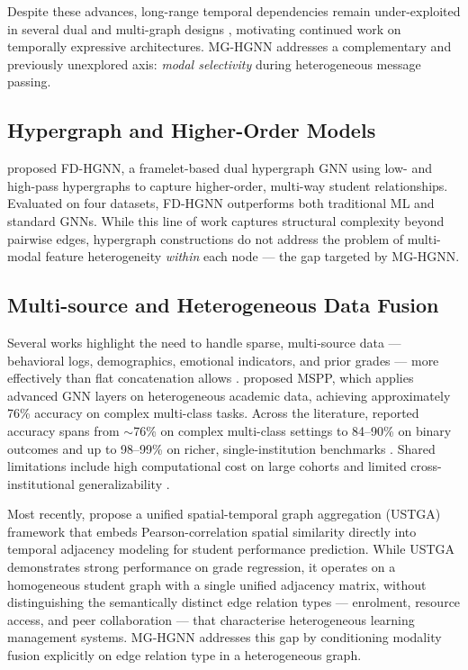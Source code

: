 \documentclass[sigconf,review]{acmart}
\begin{document}
Despite these advances, long-range temporal dependencies remain
under-exploited in several dual and multi-graph designs
\citep{huang2024dual, huang2024temporal, balachandar2024mspp}, motivating
continued work on temporally expressive architectures. MG-HGNN addresses
a complementary and previously unexplored axis: \emph{modal selectivity}
during heterogeneous message passing.

\subsection{Hypergraph and Higher-Order Models}

\citet{yang2024hypergraph} proposed FD-HGNN, a framelet-based dual
hypergraph GNN using low- and high-pass hypergraphs to capture higher-order,
multi-way student relationships. Evaluated on four datasets, FD-HGNN
outperforms both traditional ML and standard GNNs. While this line of work
captures structural complexity beyond pairwise edges, hypergraph
constructions do not address the problem of multi-modal feature
heterogeneity \emph{within} each node --- the gap targeted by MG-HGNN.

\subsection{Multi-source and Heterogeneous Data Fusion}

Several works highlight the need to handle sparse, multi-source data ---
behavioral logs, demographics, emotional indicators, and prior grades ---
more effectively than flat concatenation allows
\citep{huang2024dual, zhang2025gnttinet, huang2024temporal,
li2022studygnn, yang2024hypergraph, balachandar2024mspp}.
\citet{balachandar2024mspp} proposed MSPP, which applies advanced GNN
layers on heterogeneous academic data, achieving approximately 76\%
accuracy on complex multi-class tasks. Across the literature, reported
accuracy spans from $\sim$76\% on complex multi-class settings
\citep{balachandar2024mspp} to 84--90\% on binary outcomes
\citep{huang2024dual} and up to 98--99\% on richer, single-institution
benchmarks \citep{zhang2025gnttinet}. Shared limitations include high
computational cost on large cohorts and limited cross-institutional
generalizability \citep{huang2024dual, li2022studygnn, zhang2025gnttinet,
huang2024temporal, yang2024hypergraph, balachandar2024mspp}.

Most recently, \citet{yu2026ustga} propose a
unified spatial-temporal graph aggregation (USTGA)
framework that embeds Pearson-correlation spatial
similarity directly into temporal adjacency
modeling for student performance prediction.
While USTGA demonstrates strong performance on
grade regression, it operates on a homogeneous
student graph with a single unified adjacency
matrix, without distinguishing the semantically
distinct edge relation types --- enrolment,
resource access, and peer collaboration ---
that characterise heterogeneous learning
management systems. MG-HGNN addresses this
gap by conditioning modality fusion explicitly
on edge relation type in a heterogeneous graph.
\end{document}
